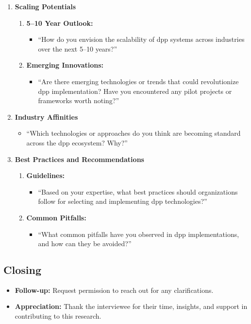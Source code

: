 \begin{enumerate}
    \item \textbf{Scaling Potentials}
    \begin{enumerate}
        \item \textbf{5--10 Year Outlook:}
        \begin{itemize}
            \item ``How do you envision the scalability of \ac{dpp} systems across industries over the next 5--10 years?''
        \end{itemize}
        \item \textbf{Emerging Innovations:}
        \begin{itemize}
            \item ``Are there emerging technologies or trends that could revolutionize \ac{dpp} implementation? Have you encountered any pilot projects or frameworks worth noting?''
        \end{itemize}
    \end{enumerate}

    \item \textbf{Industry Affinities}
    \begin{itemize}
        \item ``Which technologies or approaches do you think are becoming standard across the \ac{dpp} ecosystem? Why?''
    \end{itemize}

    \item \textbf{Best Practices and Recommendations}
    \begin{enumerate}
        \item \textbf{Guidelines:}
        \begin{itemize}
            \item ``Based on your expertise, what best practices should organizations follow for selecting and implementing \ac{dpp} technologies?''
        \end{itemize}
        \item \textbf{Common Pitfalls:}
        \begin{itemize}
            \item ``What common pitfalls have you observed in \ac{dpp} implementations, and how can they be avoided?''
        \end{itemize}
    \end{enumerate}
\end{enumerate}

\subsection*{Closing}
\begin{itemize}
    \item \textbf{Follow-up:} Request permission to reach out for any clarifications.
    \item \textbf{Appreciation:} Thank the interviewee for their time, insights, and support in contributing to this research.
\end{itemize}